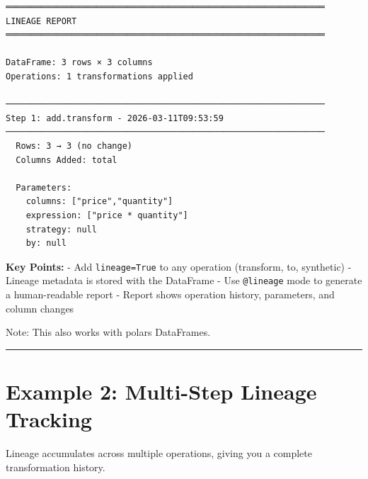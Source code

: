 \documentclass[
  letterpaper,
]{scrbook}
\begin{document}
\begin{verbatim}
═══════════════════════════════════════════════════════════════
LINEAGE REPORT
═══════════════════════════════════════════════════════════════

DataFrame: 3 rows × 3 columns
Operations: 1 transformations applied

───────────────────────────────────────────────────────────────
Step 1: add.transform - 2026-03-11T09:53:59
───────────────────────────────────────────────────────────────
  Rows: 3 → 3 (no change)
  Columns Added: total
  
  Parameters:
    columns: ["price","quantity"]
    expression: ["price * quantity"]
    strategy: null
    by: null
\end{verbatim}

\textbf{Key Points:} - Add \texttt{lineage=True} to any operation
(transform, to, synthetic) - Lineage metadata is stored with the
DataFrame - Use \texttt{@lineage} mode to generate a human-readable
report - Report shows operation history, parameters, and column changes

Note: This also works with polars DataFrames.

\begin{center}\rule{0.5\linewidth}{0.5pt}\end{center}

\section{Example 2: Multi-Step Lineage
Tracking}\label{example-2-multi-step-lineage-tracking}

Lineage accumulates across multiple operations, giving you a complete
transformation history.
\end{document}
